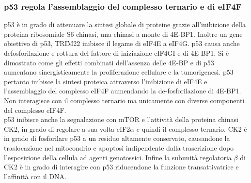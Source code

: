     \subsubsection{p53 regola l'assemblaggio del complesso ternario e di eIF4F}
    p53 \`e in grado di attenuare la sintesi globale di proteine grazie all'inibizione della proteina ribosomiale S6 chinasi, una chinasi a monte di 4E-BP1.
    Inoltre un gene obiettivo di p53, TRIM22 inibisce il legame di eIF4E a eIF4G.
    p53 causa anche defosforilazione e rottura del fattore di iniziazione eIF4GI e di 4E-BP1.
    Si \`e dimostrato come gli effetti combinati dell'assenza delle 4E-BP e di p53 aumentano sinergisticamente la proliferazione cellulare e la tumorigenesi.
    p53 pertanto inibisce la sintesi proteica attraverso l'inibizione di eIF4E e l'assemblaggio del complesso eIF4F aumendando la de-fosforilazione di 4E-BP1.
    Non interagisce con il complesso ternario ma unicamente con diverse componenti del complesso eIF4F.\\
    p53 inibisce anche la segnalazione con mTOR e l'attivit\`a della proteina chinasi CK2, in grado di regolare a sua volta eIF2$\alpha$ e quindi il complesso ternario.
    CK2 \`e in grado di fosforilare p53 a un residuo altamente conservato, causandone la traslocazione nel mitocondrio e apoptosi indipendente dalla trascrizione dopo l'esposizione della cellula ad agenti genotossici.
    Infine la subunit\`a regolatoria $\beta$ di CK2 \`e in grado di interagire con p53 riducendone la funzione transattivatrice e l'affinit\`a con il DNA.

